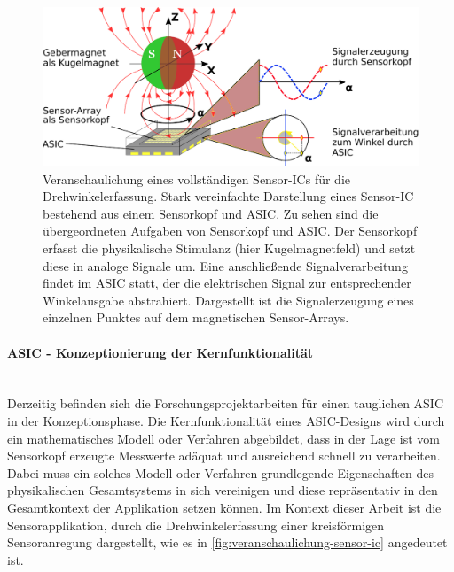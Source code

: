 \clearpage


\begin{figure}[tbph]
	\centering
	\includegraphics[width=\linewidth]{chapters/images/Veranschaulichung_Sensor-IC}
	\caption[Veranschaulichung eines vollständigen Sensor-ICs für die Drehwinkelerfassung]{Veranschaulichung eines vollständigen Sensor-ICs für die Drehwinkelerfassung. Stark vereinfachte Darstellung eines Sensor-IC bestehend aus einem Sensorkopf und ASIC. Zu sehen sind die übergeordneten Aufgaben von Sensorkopf und ASIC. Der Sensorkopf erfasst die physikalische Stimulanz (hier Kugelmagnetfeld) und setzt diese in analoge Signale um. Eine anschließende Signalverarbeitung findet im ASIC statt, der die elektrischen Signal zur entsprechender Winkelausgabe abstrahiert. Dargestellt ist die Signalerzeugung eines einzelnen Punktes auf dem magnetischen Sensor-Arrays.}
	\label{fig:veranschaulichung-sensor-ic}
\end{figure}


\paragraph{ASIC - Konzeptionierung der Kernfunktionalität}\label{par:asic-konzeptionierung-der-kernfuntionalitaet}$~$\\


Derzeitig befinden sich die Forschungsprojektarbeiten für einen tauglichen ASIC in der Konzeptionsphase. Die Kernfunktionalität eines ASIC-Designs wird durch ein mathematisches Modell oder Verfahren abgebildet, dass in der Lage ist vom Sensorkopf erzeugte Messwerte adäquat und ausreichend schnell zu verarbeiten. Dabei muss ein solches Modell oder Verfahren grundlegende Eigenschaften des physikalischen Gesamtsystems in sich vereinigen und diese repräsentativ in den Gesamtkontext der Applikation setzen können. Im Kontext dieser Arbeit ist die Sensorapplikation, durch die Drehwinkelerfassung einer kreisförmigen Sensoranregung dargestellt, wie es in \autoref{fig:veranschaulichung-sensor-ic} angedeutet ist.


